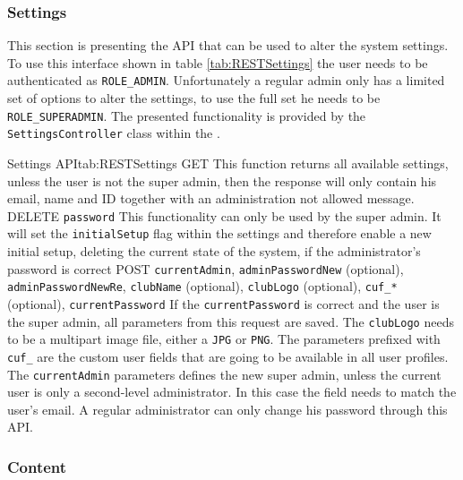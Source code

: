 \subsubsection{Settings}

This section is presenting the \gls{API} that can be used to alter the system settings. To use this interface shown in table \vref{tab:RESTSettings} the user needs to be authenticated as \texttt{ROLE\_ADMIN}. Unfortunately a regular admin only has a limited set of options to alter the settings, to use the full set he needs to be \texttt{ROLE\_SUPERADMIN}. The presented functionality is provided by the \texttt{SettingsController} class within the .

\begin{RESTTable}{Settings API}{tab:RESTSettings}
		{GET}
		{}
		{This function returns all available settings, unless the user is not the super admin, then the response will only contain his email, name and ID together with an administration not allowed message.}
		{DELETE}
		{\texttt{password}}
		{This functionality can only be used by the super admin. It will set the \texttt{initialSetup} flag within the settings and therefore enable a new initial setup, deleting the current state of the system, if the administrator's password is correct}
		{POST}
		{\texttt{currentAdmin}, \texttt{adminPasswordNew} (optional), \texttt{adminPasswordNewRe}, \texttt{clubName} (optional), \texttt{clubLogo} (optional), \texttt{cuf\_*} (optional), \texttt{currentPassword}}
		{If the \texttt{currentPassword} is correct and the user is the super admin, all parameters from this request are saved. The \texttt{clubLogo} needs to be a multipart image file, either a \texttt{JPG} or \texttt{PNG}. The parameters prefixed with \texttt{cuf\_} are the custom user fields that are going to be available in all user profiles. The \texttt{currentAdmin} parameters defines the new super admin, unless the current user is only a second-level administrator. In this case the field needs to match the user's email. A regular administrator can only change his password through this \gls{API}.}
\end{RESTTable}

\subsubsection{Content}


